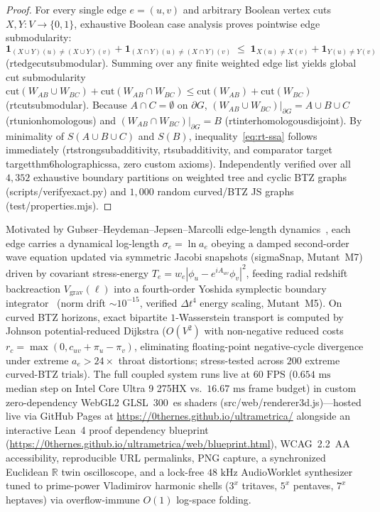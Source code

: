\documentclass[11pt,a4paper]{article}
\numberwithin{equation}{section}
\theoremstyle{plain}
\theoremstyle{definition}
\theoremstyle{remark}
\newcommand{\R}{\mathbb{R}}
\newcommand{\code}[1]{{\ttfamily\footnotesize\def\_{\textunderscore\penalty0\hskip0pt}#1}}
\begin{document}
\begin{proof}
For every single edge $e = (u, v)$ and arbitrary Boolean vertex cuts $X, Y : V \to \{0, 1\}$, exhaustive Boolean case analysis proves pointwise edge submodularity:
\[
  \mathbf{1}_{(X \cup Y)(u) \ne (X \cup Y)(v)} + \mathbf{1}_{(X \cap Y)(u) \ne (X \cap Y)(v)}
  \;\le\;
  \mathbf{1}_{X(u) \ne X(v)} + \mathbf{1}_{Y(u) \ne Y(v)}
\]
(\code{rt\_edge\_cut\_submodular}). Summing over any finite weighted edge list yields global cut submodularity $\mathrm{cut}(W_{AB} \cup W_{BC}) + \mathrm{cut}(W_{AB} \cap W_{BC}) \le \mathrm{cut}(W_{AB}) + \mathrm{cut}(W_{BC})$ (\code{rt\_cut\_submodular}). Because $A \cap C = \emptyset$ on $\partial G$, $(W_{AB} \cup W_{BC})|_{\partial G} = A \cup B \cup C$ (\code{rt\_union\_homologous}) and $(W_{AB} \cap W_{BC})|_{\partial G} = B$ (\code{rt\_inter\_homologous\_disjoint}). By minimality of $S(A \cup B \cup C)$ and $S(B)$, inequality~\eqref{eq:rt-ssa} follows immediately (\code{rt\_strong\_subadditivity}, \code{rt\_subadditivity}, and comparator target \code{target\_thm6\_holographic\_ssa}, zero custom axioms). Independently verified over all $4{,}352$ exhaustive boundary partitions on weighted tree and cyclic BTZ graphs (\code{scripts/verify\_exact.py}) and $1{,}000$ random curved/BTZ JS graphs (\code{test/properties.mjs}).
\end{proof}

Motivated by Gubser--Heydeman--Jepsen--Marcolli edge-length dynamics~\cite{GubserEdge2017}, each edge carries a dynamical log-length $\sigma_e = \ln a_e$ obeying a damped second-order wave equation updated via symmetric Jacobi snapshots (\code{\_sigmaSnap}, Mutant~M7) driven by covariant stress-energy $T_e = w_e|\phi_u - e^{i A_{uv}}\phi_v|^2$, feeding radial redshift backreaction $V_{\mathrm{grav}}(\ell)$ into a fourth-order Yoshida symplectic boundary integrator~\cite{Yoshida1990} (norm drift $\sim 10^{-15}$, verified $\Delta t^4$ energy scaling, Mutant~M5). On curved BTZ horizons, exact bipartite $1$-Wasserstein transport is computed by Johnson potential-reduced Dijkstra ($O(V^2)$ with non-negative reduced costs $r_c = \max(0, c_{uv} + \pi_u - \pi_v)$, eliminating floating-point negative-cycle divergence under extreme $a_e > 24\times$ throat distortions; stress-tested across $200$ extreme curved-BTZ trials). The full coupled system runs live at $60\text{ FPS}$ ($0.654\text{ ms}$ median step on Intel Core Ultra 9 275HX vs.\ $16.67\text{ ms}$ frame budget) in custom zero-dependency WebGL2 GLSL~300~es shaders (\code{src/web/renderer3d.js})---hosted live via GitHub Pages at \url{https://0thernes.github.io/ultrametrica/} alongside an interactive Lean~4 proof dependency blueprint (\url{https://0thernes.github.io/ultrametrica/web/blueprint.html}), WCAG~2.2~AA accessibility, reproducible URL permalinks, PNG capture, a synchronized Euclidean $\R$ twin oscilloscope, and a lock-free $48\text{ kHz}$ \code{AudioWorklet} synthesizer tuned to prime-power Vladimirov harmonic shells ($3^x$ tritaves, $5^x$ pentaves, $7^x$ heptaves) via overflow-immune $O(1)$ log-space folding.
\end{document}
